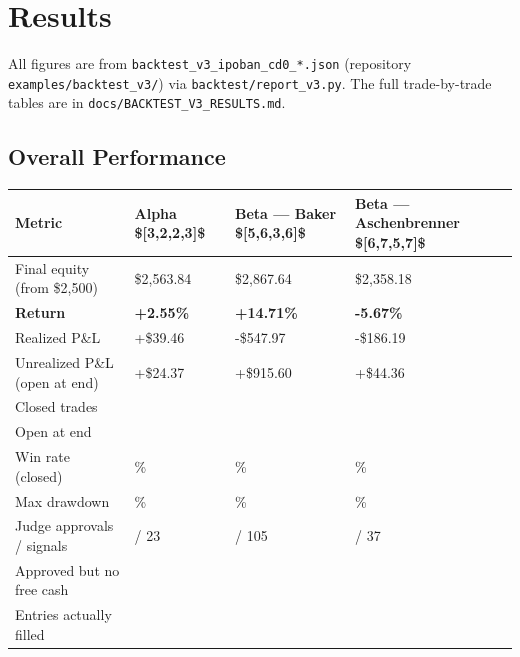 \documentclass[11pt]{article}
\begin{document}
\section{Results}\label{results}

All figures are from \texttt{backtest\_v3\_ipoban\_cd0\_*.json} (repository \texttt{examples/backtest\_v3/}) via \texttt{backtest/report\_v3.py}. The full trade-by-trade tables are in \texttt{docs/BACKTEST\_V3\_RESULTS.md}.

\subsection{Overall Performance}\label{overall-performance}

{\def\LTcaptype{none} %
{\small
\begin{longtable}{@{}
  >{\raggedright\arraybackslash}p{}
  >{\raggedright\arraybackslash}p{}
  >{\raggedright\arraybackslash}p{}
  >{\raggedright\arraybackslash}p{}@{}}
\toprule\noalign{}
\begin{minipage}[b]{\linewidth}\raggedright
Metric
\end{minipage} & \begin{minipage}[b]{\linewidth}\raggedright
Alpha \${[}3,2,2,3{]}\$
\end{minipage} & \begin{minipage}[b]{\linewidth}\raggedright
Beta --- Baker \${[}5,6,3,6{]}\$
\end{minipage} & \begin{minipage}[b]{\linewidth}\raggedright
Beta --- Aschenbrenner \${[}6,7,5,7{]}\$
\end{minipage} \\
\midrule\noalign{}
\endhead
\bottomrule\noalign{}
\endlastfoot
\renewcommand{\arraystretch}{1.15}
Final equity (from \$2,500) & \$2,563.84 & \$2,867.64 & \$2,358.18 \\
\textbf{Return} & \textbf{+2.55\%} & \textbf{+14.71\%} & \textbf{-5.67\%} \\
Realized P\&L & +\$39.46 & -\$547.97 & -\$186.19 \\
Unrealized P\&L (open at end) & +\$24.37 & +\$915.60 & +\$44.36 \\
Closed trades & 22 & 10 & 3 \\
Open at end & 1 & 5 & 2 \\
Win rate (closed) & 41\% & 0\% & 0\% \\
Max drawdown & -2.9\% & -30.7\% & -9.4\% \\
Judge approvals / signals & 23 / 23 & 80 / 105 & 5 / 37 \\
Approved but no free cash & 0 & 65 & 0 \\
Entries actually filled & 23 & 15 & 5 \\
\end{longtable}}
}
\end{document}
